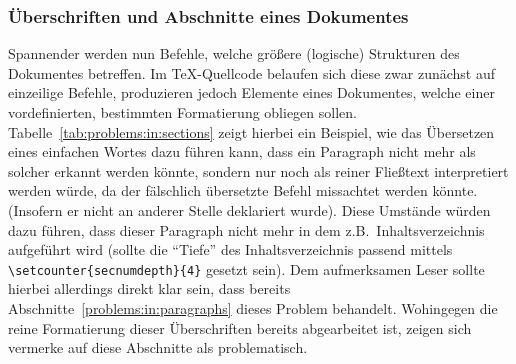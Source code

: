 \subsubsection*{Überschriften und Abschnitte eines Dokumentes}
Spannender werden nun Befehle, welche größere (logische) Strukturen des Dokumentes betreffen. Im \TeX{}-Quellcode belaufen sich diese zwar zunächst auf einzeilige Befehle, produzieren jedoch Elemente eines Dokumentes, welche einer vordefinierten, bestimmten Formatierung obliegen sollen. Tabelle~\ref{tab:problems:in:sections} zeigt hierbei ein Beispiel, wie das Übersetzen eines einfachen Wortes dazu führen kann, dass ein Paragraph nicht mehr als solcher erkannt werden könnte, sondern nur noch als reiner Fließtext interpretiert werden würde, da der fälschlich übersetzte Befehl missachtet werden könnte. (Insofern er nicht an anderer Stelle deklariert wurde). Diese Umstände würden dazu führen, dass dieser Paragraph nicht mehr in dem z.B.\ Inhaltsverzeichnis aufgeführt wird (sollte die \enquote{Tiefe} des Inhaltsverzeichnis passend mittels \verb|\setcounter{secnumdepth}{4}|%
gesetzt sein).
Dem aufmerksamen Leser sollte hierbei allerdings direkt klar sein, dass bereits Abschnitte~\ref{problems:in:paragraphs} dieses Problem behandelt. Wohingegen die reine Formatierung dieser Überschriften bereits abgearbeitet ist, zeigen sich vermerke auf diese Abschnitte als problematisch. 

